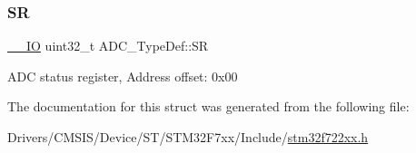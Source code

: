 \subsubsection{\texorpdfstring{SR}{SR}}
{\footnotesize\ttfamily \mbox{\hyperlink{core__sc300_8h_aec43007d9998a0a0e01faede4133d6be}{\+\_\+\+\_\+\+IO}} uint32\+\_\+t A\+D\+C\+\_\+\+Type\+Def\+::\+SR}

A\+DC status register, Address offset\+: 0x00 

The documentation for this struct was generated from the following file\+:\begin{DoxyCompactItemize}
\item 
Drivers/\+C\+M\+S\+I\+S/\+Device/\+S\+T/\+S\+T\+M32\+F7xx/\+Include/\mbox{\hyperlink{stm32f722xx_8h}{stm32f722xx.\+h}}\end{DoxyCompactItemize}
